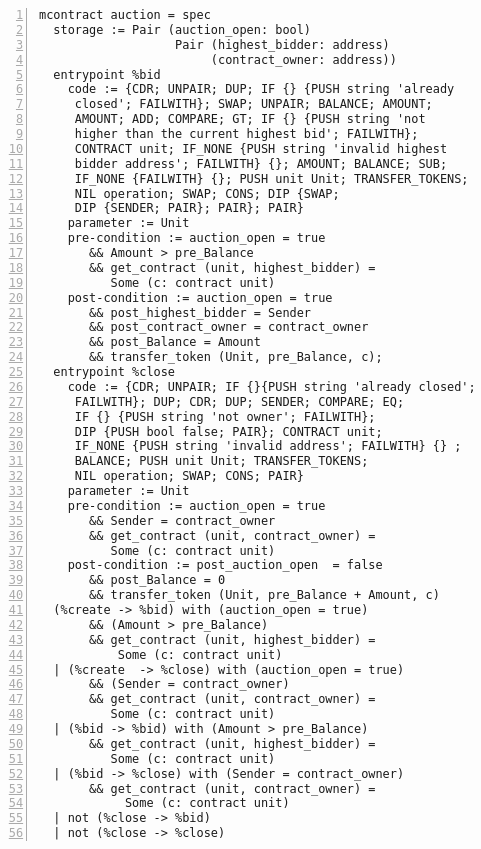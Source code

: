 \begin{lstlisting}[float=tp,captionpos=b,caption={Auction contract specification},label={lst:auction-contract-specification},numbers=left]
mcontract auction = spec 
  storage := Pair (auction_open: bool) 
                   Pair (highest_bidder: address)
                        (contract_owner: address))
  entrypoint %bid
    code := {CDR; UNPAIR; DUP; IF {} {PUSH string 'already
     closed'; FAILWITH}; SWAP; UNPAIR; BALANCE; AMOUNT; 
     AMOUNT; ADD; COMPARE; GT; IF {} {PUSH string 'not 
     higher than the current highest bid'; FAILWITH};
     CONTRACT unit; IF_NONE {PUSH string 'invalid highest 
     bidder address'; FAILWITH} {}; AMOUNT; BALANCE; SUB; 
     IF_NONE {FAILWITH} {}; PUSH unit Unit; TRANSFER_TOKENS; 
     NIL operation; SWAP; CONS; DIP {SWAP; 
     DIP {SENDER; PAIR}; PAIR}; PAIR}
    parameter := Unit 
    pre-condition := auction_open = true
       && Amount > pre_Balance
       && get_contract (unit, highest_bidder) = 
          Some (c: contract unit)
    post-condition := auction_open = true
       && post_highest_bidder = Sender 
       && post_contract_owner = contract_owner 
       && post_Balance = Amount 
       && transfer_token (Unit, pre_Balance, c);
  entrypoint %close
    code := {CDR; UNPAIR; IF {}{PUSH string 'already closed'; 
     FAILWITH}; DUP; CDR; DUP; SENDER; COMPARE; EQ;
     IF {} {PUSH string 'not owner'; FAILWITH};
     DIP {PUSH bool false; PAIR}; CONTRACT unit; 
     IF_NONE {PUSH string 'invalid address'; FAILWITH} {} ;
     BALANCE; PUSH unit Unit; TRANSFER_TOKENS; 
     NIL operation; SWAP; CONS; PAIR}
    parameter := Unit
    pre-condition := auction_open = true
       && Sender = contract_owner  
       && get_contract (unit, contract_owner) = 
          Some (c: contract unit)              
    post-condition := post_auction_open  = false
       && post_Balance = 0 
       && transfer_token (Unit, pre_Balance + Amount, c) 
  (%create -> %bid) with (auction_open = true)  
       && (Amount > pre_Balance) 
       && get_contract (unit, highest_bidder) = 
           Some (c: contract unit)
  | (%create  -> %close) with (auction_open = true) 
       && (Sender = contract_owner)
       && get_contract (unit, contract_owner) = 
          Some (c: contract unit)
  | (%bid -> %bid) with (Amount > pre_Balance) 
       && get_contract (unit, highest_bidder) = 
          Some (c: contract unit)
  | (%bid -> %close) with (Sender = contract_owner) 
       && get_contract (unit, contract_owner) = 
            Some (c: contract unit)
  | not (%close -> %bid)
  | not (%close -> %close)
\end{lstlisting}

